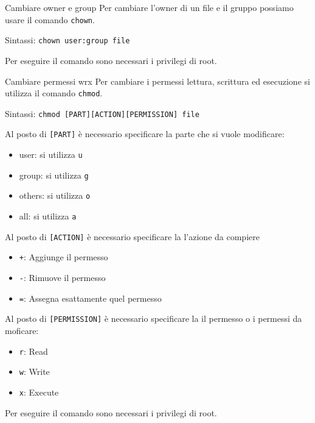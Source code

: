 \documentclass{beamer}
\begin{document}
\begin{frame}{Cambiare owner e group}
  Per cambiare l'owner di un file e il gruppo possiamo usare il comando 
  \texttt{chown}.\bigskip

  Sintassi: \texttt{chown user:group file}\bigskip

  Per eseguire il comando sono necessari i privilegi di root.
\end{frame}

\begin{frame}{Cambiare permessi wrx}
  Per cambiare i permessi lettura, scrittura ed esecuzione si utilizza il 
  comando \texttt{chmod}.\bigskip

  Sintassi: \texttt{chmod [PART][ACTION][PERMISSION] file}\bigskip

   {
  Al posto di \texttt{[PART]} è necessario specificare la 
  parte che si vuole modificare:
  \begin{itemize}
    \item user: si utilizza \texttt{u}
    \item group: si utilizza \texttt{g}
    \item others: si utilizza \texttt{o}
    \item all: si utilizza \texttt{a}
  \end{itemize}
  }

   {
  Al posto di \texttt{[ACTION]} è necessario specificare la 
  l'azione da compiere
  \begin{itemize}
    \item \texttt{+}: Aggiunge il permesso
    \item \texttt{-}: Rimuove il permesso
    \item \texttt{=}: Assegna esattamente quel permesso
  \end{itemize}
  }

   {
  Al posto di \texttt{[PERMISSION]} è necessario specificare la 
  il permesso o i permessi da moficare:
  \begin{itemize}
    \item \texttt{r}: Read
    \item \texttt{w}: Write
    \item \texttt{x}: Execute
  \end{itemize}
  }

  \bigskip Per eseguire il comando sono necessari i privilegi di root.
\end{frame}
\end{document}
